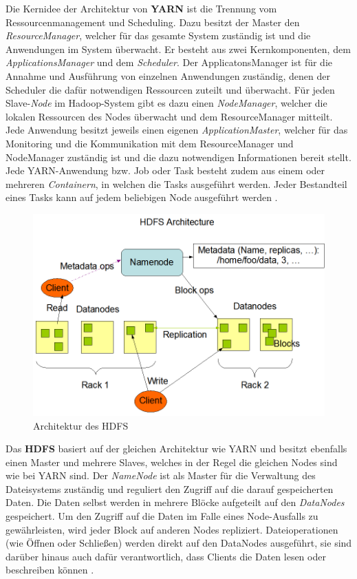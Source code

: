 Die Kernidee der Architektur von \textbf{YARN} ist die Trennung vom Ressourcenmanagement und Scheduling. Dazu besitzt der Master den \emph{ResourceManager}, welcher für das gesamte System zuständig ist und die Anwendungen im System überwacht. Er besteht aus zwei Kernkomponenten, dem \emph{ApplicationsManager} und dem \emph{Scheduler}. Der ApplicatonsManager ist für die Annahme und Ausführung von einzelnen Anwendungen zuständig, denen der Scheduler die dafür notwendigen Ressourcen zuteilt und überwacht. Für jeden Slave-\emph{Node} im Hadoop-System gibt es dazu einen \emph{NodeManager}, welcher die lokalen Ressourcen des Nodes überwacht und dem ResourceManager mitteilt. Jede Anwendung besitzt jeweils einen eigenen \emph{ApplicationMaster}, welcher für das Monitoring und die Kommunikation mit dem ResourceManager und NodeManager zuständig ist und die dazu notwendigen Informationen bereit stellt. Jede YARN-Anwendung bzw. Job oder Task besteht zudem aus einem oder mehreren \emph{Containern}, in welchen die Tasks ausgeführt werden. Jeder Bestandteil eines Tasks kann auf jedem beliebigen Node ausgeführt werden \cite{HadoopYarnDesc272}.

\begin{figure}
    \centering
    \includegraphics[width=.8\columnwidth]{./images/hdfsarchitecture.png}
    \caption[Architektur des HDFS]{Architektur des HDFS \cite{HadoopHdfsDesc272}}
    \label{fig:hdfsarch}
\end{figure}

Das \textbf{HDFS} basiert auf der gleichen Architektur wie YARN und besitzt ebenfalls einen Master und mehrere Slaves, welches in der Regel die gleichen Nodes sind wie bei YARN sind. Der \emph{NameNode} ist als Master für die Verwaltung des Dateisystems zuständig und reguliert den Zugriff auf die darauf gespeicherten Daten. Die Daten selbst werden in mehrere Blöcke aufgeteilt auf den \emph{DataNodes} gespeichert. Um den Zugriff auf die Daten im Falle eines Node-Ausfalls zu gewährleisten, wird jeder Block auf anderen Nodes repliziert. Dateioperationen (wie Öffnen oder Schließen) werden direkt auf den DataNodes ausgeführt, sie sind darüber hinaus auch dafür verantwortlich, dass Clients die Daten lesen oder beschreiben können \cite{HadoopHdfsDesc272}.

